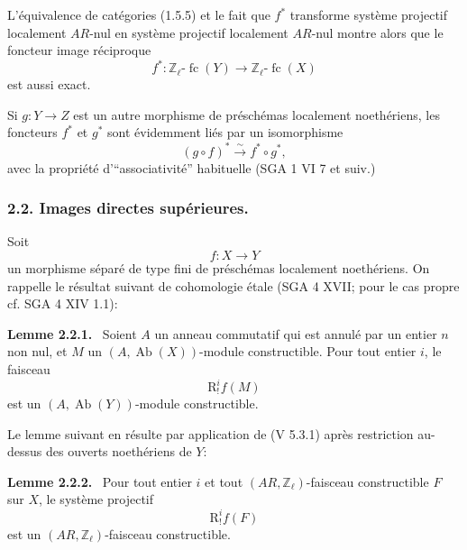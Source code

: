 \documentclass[11pt]{article}
\newenvironment{statement}[1]{\par\medskip\noindent\textbf{#1.}\ }{\par\medskip}
\providecommand{\Ab}{\operatorname{Ab}}
\providecommand{\fc}{\operatorname{fc}}
\providecommand{\Ab}{\operatorname{Ab}}
\begin{document}
L'équivalence de catégories (1.5.5) et le fait que \(f^*\) transforme système projectif localement \(AR\)-nul en système projectif localement \(AR\)-nul montre alors que le foncteur image réciproque
\[
f^*:\mathbb Z_\ell\text{-}\fc(Y)\longrightarrow \mathbb Z_\ell\text{-}\fc(X)
\]
est aussi exact.

Si \(g:Y\to Z\) est un autre morphisme de préschémas localement noethériens, les foncteurs \(f^*\) et \(g^*\) sont évidemment liés par un isomorphisme
\[
(g\circ f)^*\xrightarrow{\sim}f^*\circ g^*,
\]
avec la propriété d'``associativité'' habituelle (SGA 1 VI 7 et suiv.)

\subsubsection*{2.2. Images directes supérieures.}

Soit
\[
f:X\longrightarrow Y
\]
un morphisme séparé de type fini de préschémas localement noethériens. On rappelle le résultat suivant de cohomologie étale (SGA 4 XVII; pour le cas propre cf. SGA 4 XIV 1.1):

\begin{statement}{Lemme 2.2.1}
Soient \(A\) un anneau commutatif qui est annulé par un entier \(n\) non nul, et \(M\) un \((A,\Ab(X))\)-module constructible. Pour tout entier \(i\), le faisceau
\[
\mathrm{R}^i_!f(M)
\]
est un \((A,\Ab(Y))\)-module constructible.
\end{statement}

Le lemme suivant en résulte par application de (V 5.3.1) après restriction au-dessus des ouverts noethériens de \(Y\):

\begin{statement}{Lemme 2.2.2}
Pour tout entier \(i\) et tout \((AR,\mathbb Z_\ell)\)-faisceau constructible \(F\) sur \(X\), le système projectif
\[
\mathrm{R}^i_!f(F)
\]
est un \((AR,\mathbb Z_\ell)\)-faisceau constructible.
\end{statement}
\end{document}
